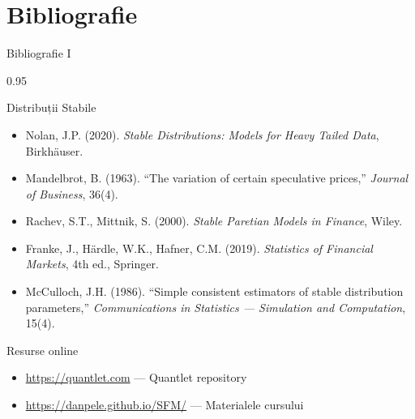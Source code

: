 \documentclass[9pt, aspectratio=169, t]{beamer}
\begin{document}
\section{Bibliografie}

\begin{frame}{Bibliografie I}
    \begin{cminipage}{0.95\textwidth}
    \begin{block}{Distribuții Stabile}
        {\small
        \begin{itemize}\setlength{\itemsep}{0pt}
            \item Nolan, J.P. (2020). \textit{Stable Distributions: Models for Heavy Tailed Data}, Birkh\"{a}user.
            \item Mandelbrot, B. (1963). ``The variation of certain speculative prices,'' \textit{Journal of Business}, 36(4).
            \item Rachev, S.T., Mittnik, S. (2000). \textit{Stable Paretian Models in Finance}, Wiley.
            \item Franke, J., H\"{a}rdle, W.K., Hafner, C.M. (2019). \textit{Statistics of Financial Markets}, 4th ed., Springer.
            \item McCulloch, J.H. (1986). ``Simple consistent estimators of stable distribution parameters,'' \textit{Communications in Statistics --- Simulation and Computation}, 15(4).
        \end{itemize}
        }
    \end{block}

    \begin{exampleblock}{Resurse online}
        {\small
        \begin{itemize}\setlength{\itemsep}{0pt}
            \item \url{https://quantlet.com} --- Quantlet repository
            \item \url{https://danpele.github.io/SFM/} --- Materialele cursului
        \end{itemize}
        }
    \end{exampleblock}
    \end{cminipage}
\end{frame}
\end{document}
